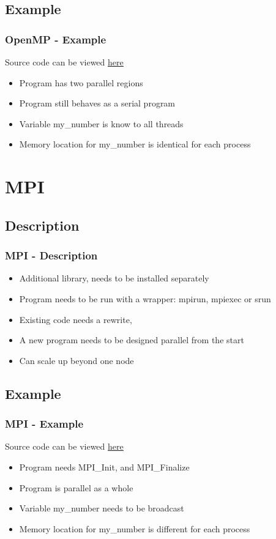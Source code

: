 \documentclass[hyperref={pdfpagelabels=false}]{beamer}
\begin{document}
    \subsection{Example}
    \begin{frame}
        \frametitle{OpenMP - Example}
        Source code can be viewed \href{https://github.com/jjengelberts/parallelization/blob/master/examples/example_openmp.c}{\underline{here}}
        \begin{itemize}
            \item Program has two parallel regions
            \item Program still behaves as a serial program
            \item Variable my\_number is know to all threads
            \item Memory location for my\_number is identical for each process
        \end{itemize} 
    \end{frame}

    \section{MPI} 
    \subsection{Description}
    \begin{frame}
        \frametitle{MPI - Description}
        \begin{itemize}
            \item Additional library, needs to be installed separately  
            \item Program needs to be run with a wrapper: mpirun, mpiexec or srun
            \item Existing code needs a rewrite,
            \item A new program needs to be designed parallel from the start 
            \item Can scale up beyond one node
        \end{itemize} 
    \end{frame}

    \subsection{Example}
    \begin{frame}
        \frametitle{MPI - Example}
        Source code can be viewed \href{https://github.com/jjengelberts/parallelization/blob/master/examples/example_mpi.c}{\underline{here}}
        \begin{itemize}
            \item Program needs MPI\_Init, and MPI\_Finalize
            \item Program is parallel as a whole
            \item Variable my\_number needs to be broadcast 
            \item Memory location for my\_number is different for each process
        \end{itemize} 
    \end{frame}
\end{document}
